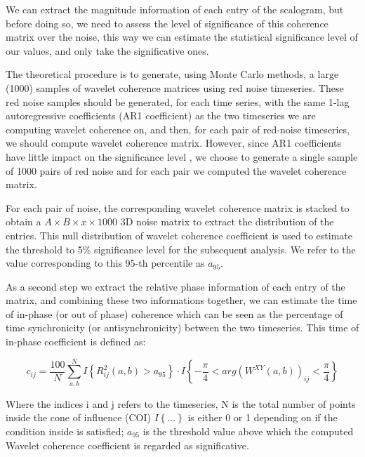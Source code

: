 \documentclass[12pt]{report}
\begin{document}
We can extract the magnitude information of each entry of the scalogram, but before doing so, we need to assess the level of significance of this coherence matrix over the noise, this way we can estimate the statistical significance level of our values, and only take the significative ones.

The theoretical procedure \cite{grinsted-2004} \cite{bernas-2018} is to generate, using Monte Carlo methods, a large (1000) samples of wavelet coherence matrices using red noise timeseries.
These red noise samples should be generated, for each time series, with the same 1-lag autoregressive coefficients (AR1 coefficient) as the two timeseries we are computing wavelet coherence on, and then, for each pair of red-noise timeseries, we should compute wavelet coherence matrix.
However, since AR1 coefficients have little impact on the significance level \cite{grinsted-2004}, we choose to generate a single sample of 1000 pairs of red noise and for each pair we computed the wavelet coherence matrix.

For each pair of noise, the corresponding wavelet coherence matrix is stacked to obtain a $A\times B \times x \times 1000$ 3D noise matrix to extract the distribution of the entries.
This null distribution of wavelet coherence coefficient is used to estimate the threshold to 5\% significance level for the subsequent analysis.
We refer to the value corresponding to this 95-th percentile as $a_{95}$.


As a second step we extract the relative phase information of each entry of the matrix, and combining these two informations together, we can estimate the time of in-phase (or out of phase) coherence which can be seen as the percentage of time synchronicity (or antisynchronicity) between the two timeseries. \cite{bernas-2018}
This time of in-phase coefficient is defined as:

\begin{equation} \label{eq:wcohcoefficients}
c_{ij} = \frac{100}{N}\sum_{a, b}^N I\left\{ R_{ij}^2(a,b) > a_{95}\right\}\cdot I\left\{-\frac{\pi}{4}<arg(W^{XY}(a, b))_{ij} < \frac{\pi}{4}  \right\}
\end{equation}

Where the indices i and j refers to the timeseries, N is the total number of points inside the cone of influence (COI) $I\left\{ ...\right\}$ is either 0 or 1 depending on if the condition inside is satisfied; $a_{95}$ is the threshold value above which the computed Wavelet coherence coefficient is regarded as significative.
\end{document}

